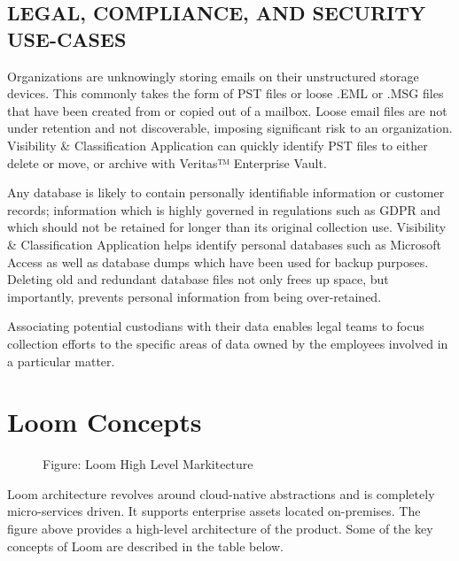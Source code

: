 \documentclass[letterpaper,10pt,english]{sphinxhowto}
\begin{document}
\subsection{LEGAL, COMPLIANCE, AND SECURITY USE-CASES}
\label{\detokenize{col/ds/mcdmp_ds_opt3:legal-compliance-and-security-use-cases}}
 Organizations are unknowingly storing emails on their unstructured storage devices. This commonly takes the form of PST files or loose .EML or .MSG files that have been created from or copied out of a mailbox. Loose email files are not under retention and not discoverable, imposing significant risk to an organization. Visibility \& Classification Application can quickly identify PST files to either delete or move, or archive with Veritas™ Enterprise Vault.

 Any database is likely to contain personally identifiable information or customer records; information which is highly governed in regulations such as GDPR and which should not be retained for longer than its original collection use. Visibility \& Classification Application helps identify personal databases such as Microsoft Access as well as database dumps which have been used for backup purposes. Deleting old and redundant database files not only frees up space, but importantly, prevents personal information from being over-retained.

 Associating potential custodians with their data enables legal teams to focus collection efforts to the specific areas of data owned by the employees involved in a particular matter.


\section{Loom Concepts}
\label{\detokenize{col/ds/mcdmp_ds_opt3:loom-concepts}}
\begin{figure}[htbp]
\centering
\capstart

\noindent{}
\caption{Figure: Loom High Level Markitecture}\label{\detokenize{col/ds/mcdmp_ds_opt3:id1}}\end{figure}

Loom architecture revolves around cloud-native abstractions and is completely micro-services driven. It supports enterprise assets located on-premises. The figure above provides a high-level architecture of the product. Some of the key concepts of Loom are described in the table below.
\end{document}
